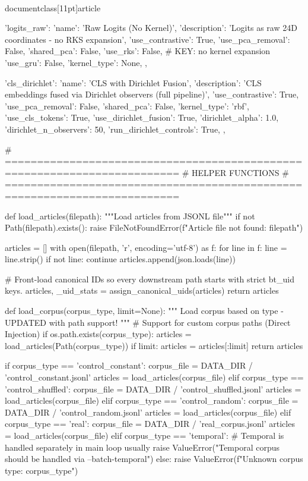 \\documentclass[11pt]{article}
\begin{document}
\begin{CodeBlock}
{    'logits_raw': {
        'name': 'Raw Logits (No Kernel)',
        'description': 'Logits as raw 24D coordinates - no RKS expansion',
        'use_contrastive': True,
        'use_pca_removal': False,
        'shared_pca': False,
        'use_rks': False,  # KEY: no kernel expansion
        'use_gru': False,
        'kernel_type': None,
    },
    
    'cls_dirichlet': {
        'name': 'CLS with Dirichlet Fusion',
        'description': 'CLS embeddings fused via Dirichlet observers (full pipeline)',
        'use_contrastive': True,
        'use_pca_removal': False,
        'shared_pca': False,
        'kernel_type': 'rbf',
        'use_cls_tokens': True,
        'use_dirichlet_fusion': True,
        'dirichlet_alpha': 1.0,
        'dirichlet_n_observers': 50,
        'run_dirichlet_controls': True,
    },
}


# =========================================================================
# HELPER FUNCTIONS
# =========================================================================

def load_articles(filepath):
    """Load articles from JSONL file"""
    if not Path(filepath).exists():
        raise FileNotFoundError(f"Article file not found: {filepath}")
    
    articles = []
    with open(filepath, 'r', encoding='utf-8') as f:
        for line in f:
            line = line.strip()
            if not line:
                continue
            articles.append(json.loads(line))

    # Front-load canonical IDs so every downstream path starts with strict bt_uid keys.
    articles, _uid_stats = assign_canonical_uids(articles)
    return articles


def load_corpus(corpus_type, limit=None):
    """
    Load corpus based on type - UPDATED with path support!
    """
    # Support for custom corpus paths (Direct Injection)
    if os.path.exists(corpus_type):
        articles = load_articles(Path(corpus_type))
        if limit:
            articles = articles[:limit]
        return articles

    if corpus_type == 'control_constant':
        corpus_file = DATA_DIR / 'control_constant.jsonl'
        articles = load_articles(corpus_file)
    elif corpus_type == 'control_shuffled':
        corpus_file = DATA_DIR / 'control_shuffled.jsonl'
        articles = load_articles(corpus_file)
    elif corpus_type == 'control_random':
        corpus_file = DATA_DIR / 'control_random.jsonl'
        articles = load_articles(corpus_file)
    elif corpus_type == 'real':
        corpus_file = DATA_DIR / 'real_corpus.jsonl'
        articles = load_articles(corpus_file)
    elif corpus_type == 'temporal':
        # Temporal is handled separately in main loop usually
        raise ValueError("Temporal corpus should be handled via --batch-temporal")
    else:
        raise ValueError(f"Unknown corpus type: {corpus_type}")


\end{CodeBlock}
\end{document}
